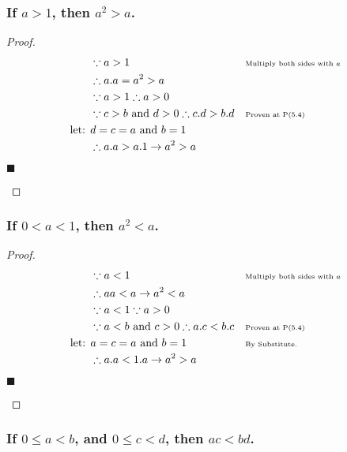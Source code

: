 \documentclass[letterpaper, 10 pt, conference]{ieeeconf}  %
\begin{document}
\subsubsection{\textbf{If $a > 1$, then $a^2 > a$.}}

\begin{proof}
\begin{align}
    &\because a > 1 && \text{\tiny{Multiply both sides with $a$}} \\
    &\therefore a.a = a^2 > a &&\\
    &\because a > 1 \therefore a > 0 &&  \\
    &\because c > b \text{ and }  d > 0 \therefore c.d > b.d && \text{\tiny{Proven at P(5.4)}} \\
    \text{let: } & d = c = a \text{ and } b = 1 && \\
    & \therefore a.a > a.1 \rightarrow a^2 > a&&
\end{align}
\begin{flushright}
$\blacksquare$
\end{flushright}
\end{proof}

\subsubsection{\textbf{If $0 < a < 1$, then $a^2 < a$.}}

\begin{proof}
\begin{align}
    &\because a < 1 && \text{\tiny{Multiply both sides with $a$}}\\
    &\therefore aa < a \rightarrow a^2 < a &&\\
    &\because a < 1 \because a > 0 &&  \\
    &\because a < b \text{ and }  c > 0 \therefore a.c < b.c && \text{\tiny{Proven at P(5.4)}} \\
    \text{let: } & a = c = a \text{ and } b = 1 && \text{\tiny{By Substitute}.}\\
    & \therefore a.a < 1.a \rightarrow a^2 > a&&
\end{align}
\begin{flushright}
$\blacksquare$
\end{flushright}
\end{proof}

\subsubsection{\textbf{If $0 \leq  a < b$, and $0 \leq c < d$, then $ac < bd$.}}
\end{document}
